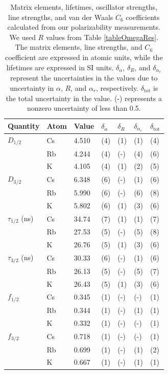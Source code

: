 \documentclass[twocolumn,prl,showpacs,superscriptaddress,longbibliography]{revtex4-1}   %
\begin{document}
\begingroup
\begin{table}
\caption{\label{tableMisc}Matrix elements, lifetimes, oscillator strengths, line strengths, and van der Waals $C_6$ coefficients calculated from our polarizability measurements.
We used $R$ values from Table \ref{tableOmegaRes}. The matrix elements, line strengths, and $C_6$ coefficient are expressed in atomic units, while the lifetimes are expressed in SI units.
$\delta_{\alpha}$, $\delta_{R}$, and $\delta_{\alpha_r}$ represent the uncertainties in the values due to uncertainty in $\alpha$, $R$, and $\alpha_r$, respectively. $\delta_{\mathrm{tot}}$ is the total uncertainty in the value. (-) represents a nonzero uncertainty of less than 0.5.}
\begin{center}
\begin{tabular}{lllllll}
\hline\hline
Quantity & Atom & Value & $\delta_{\alpha}$ & $\delta_{R}$ & $\delta_{\alpha_r}$ & $\delta_{\mathrm{tot}}$ \\
\hline
$D_{1/2}$ 		& Cs & 4.510 & (4) & (1) & (1) & (4) \\
 					& Rb & 4.244 & (4) & (-) & (4) & (6) \\
 					& K  & 4.105 & (4) & (1) & (2) & (5) \\ \hline
$D_{3/2}$ 		& Cs & 6.348 & (6) & (-) & (1) & (6) \\
 					& Rb & 5.990 & (6) & (-) & (6) & (8) \\
 					& K  & 5.802 & (6) & (1) & (3) & (6) \\ \hline
$\tau_{1/2}$ (ns) 	& Cs & 34.74 & (7) & (1) & (1) & (7) \\
 					& Rb & 27.53 & (5) & (-) & (5) & (8) \\
 					& K  & 26.76 & (5) & (1) & (3) & (6) \\ \hline
$\tau_{3/2}$ (ns) 	& Cs & 30.33 & (6) & (-) & (1) & (6) \\
 					& Rb & 26.13 & (5) & (-) & (5) & (7) \\
 					& K  & 26.43 & (5) & (1) & (3) & (6) \\ \hline
$f_{1/2}$ 			& Cs & 0.345 & (1) & (-) & (-) & (1) \\
 					& Rb & 0.344 & (1) & (-) & (1) & (1) \\
 					& K  & 0.332 & (1) & (-) & (-) & (1) \\ \hline
$f_{3/2}$ 			& Cs & 0.718 & (1) & (-) & (-) & (1) \\
 					& Rb & 0.699 & (1) & (-) & (1) & (2) \\
 					& K  & 0.667 & (1) & (-) & (1) & (1) \\ \hline

\end{tabular}
\end{center}
\end{table}
\end{document}

